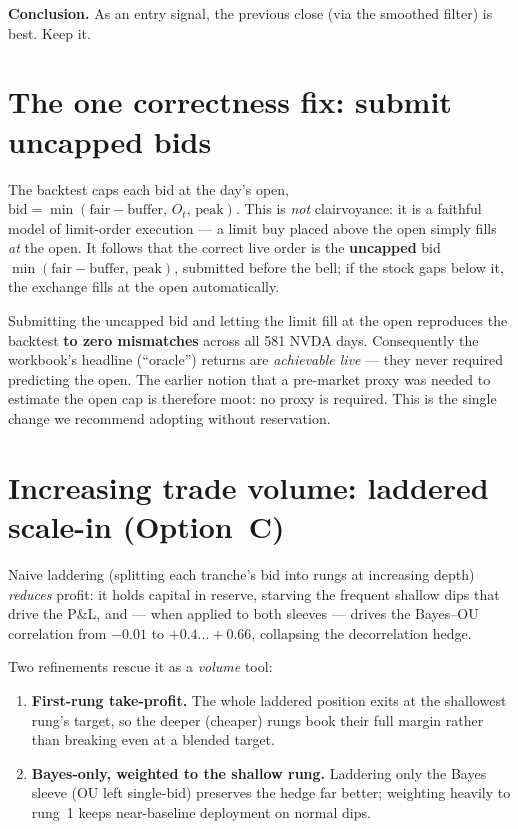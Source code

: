 \documentclass[11pt]{article}
\begin{document}
\textbf{Conclusion.} As an entry signal, the previous close (via the smoothed filter) is best.
Keep it.

\section{The one correctness fix: submit uncapped bids}

The backtest caps each bid at the day's open, $\text{bid}=\min(\text{fair}-\text{buffer},\,
O_t,\,\text{peak})$. This is \emph{not} clairvoyance: it is a faithful model of limit-order
execution --- a limit buy placed above the open simply fills \emph{at} the open. It follows
that the correct live order is the \textbf{uncapped} bid
$\min(\text{fair}-\text{buffer},\,\text{peak})$, submitted before the bell; if the stock gaps
below it, the exchange fills at the open automatically.

Submitting the uncapped bid and letting the limit fill at the open reproduces the backtest
\textbf{to zero mismatches} across all 581 NVDA days. Consequently the workbook's headline
(``oracle'') returns are \emph{achievable live} --- they never required predicting the open.
The earlier notion that a pre-market proxy was needed to estimate the open cap is therefore
moot: no proxy is required. This is the single change we recommend adopting without
reservation.

\section{Increasing trade volume: laddered scale-in (Option~C)}

Naive laddering (splitting each tranche's bid into rungs at increasing depth) \emph{reduces}
profit: it holds capital in reserve, starving the frequent shallow dips that drive the P\&L,
and --- when applied to both sleeves --- drives the Bayes--OU correlation from $-0.01$ to
$+0.4\ldots+0.66$, collapsing the decorrelation hedge.

Two refinements rescue it as a \emph{volume} tool:
\begin{enumerate}[leftmargin=1.6em,itemsep=2pt]
  \item \textbf{First-rung take-profit.} The whole laddered position exits at the shallowest
        rung's target, so the deeper (cheaper) rungs book their full margin rather than
        breaking even at a blended target.
  \item \textbf{Bayes-only, weighted to the shallow rung.} Laddering only the Bayes sleeve
        (OU left single-bid) preserves the hedge far better; weighting heavily to rung~1 keeps
        near-baseline deployment on normal dips.
\end{enumerate}
\end{document}
